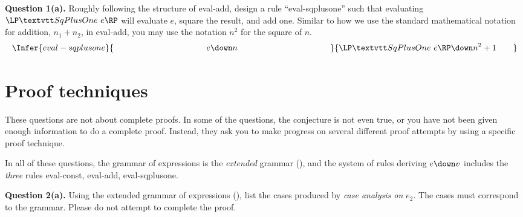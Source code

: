 \vspace*{-1.2ex}

{\noindent \textbf{Question 1(a).}}
Roughly following the structure of eval-add, design a rule ``eval-sqplusone'' such that
evaluating $\sqplusoneexp{e}$ will evaluate $e$, square the result, and add one.  Similar to how we use the
standard mathematical notation for addition, $n_1 + n_2$, in eval-add, you may use the notation $n^2$ for the square of $n$.
\[
     \Infer{eval-sqplusone}
           {
              \hspace*{110pt}
              e \down n
              \hspace*{110pt}
           }
           {
             \sqplusoneexp{e} \down n^2+1
           \hspace*{20pt}
          }
\]

\clearpage

\section{Proof techniques}

These questions are not about complete proofs.
In some of the questions, the conjecture is not even true, or you
have not been given enough information to do a complete proof.
Instead, they ask you to make progress on several different proof attempts
by using a specific proof technique.

In all of these questions, the grammar of expressions is the \emph{extended}
grammar (), and the system of rules deriving $e \down v$ includes the \emph{three} rules eval-const, eval-add, eval-sqplusone.

\textbf{Question 2(a).}
Using the extended grammar of expressions (),
list the cases produced by \emph{case analysis on $e_2$}.
The cases must correspond to the grammar.
Please do not attempt to complete the proof.

